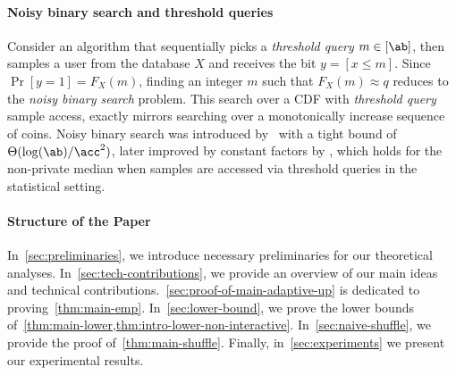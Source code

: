 \paragraph{Noisy binary search and threshold queries} Consider an algorithm that sequentially picks a \textit{threshold query} $m\in[\ab]$, then samples a user from the database $X$ and receives the bit $y=[x\leq m]$. Since $\Pr[y = 1] = F_X(m)$, finding an integer $m$ such that $F_X(m) \approx q$ reduces to the \textit{noisy binary search} problem. This search over a CDF with \textit{threshold query} sample access, exactly mirrors searching over a monotonically increase sequence of coins. Noisy binary search was introduced by~\cite{karp2007noisy} with a tight bound of $\Theta(\log(\ab)/\acc^2)$, later improved by constant factors by \cite{gretta2023sharp}, which holds for the non-private median when samples are accessed via threshold queries in the statistical setting. 

%

%
%
%
%

%
%

%


\paragraph{Structure of the Paper}
In~\cref{sec:preliminaries}, we introduce necessary preliminaries for our theoretical analyses. In~\cref{sec:tech-contributions}, we provide an overview of our main ideas and technical contributions.~\cref{sec:proof-of-main-adaptive-up} is dedicated to proving~\cref{thm:main-emp}. In~\cref{sec:lower-bound}, we prove the lower bounds of~\cref{thm:main-lower,thm:intro-lower-non-interactive}. In~\cref{sec:naive-shuffle}, we provide the proof of~\cref{thm:main-shuffle}. Finally, in~\cref{sec:experiments} we present our experimental results.